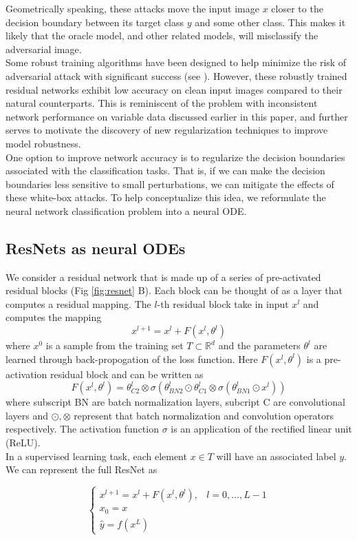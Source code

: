 \documentclass[12pt]{article}
\begin{document}
Geometrically speaking, these attacks move the input image $x$ closer to the decision boundary between its target class $y$ and some other class. This makes it likely that the oracle model, and other related models, will misclassify the adversarial image. \\
Some robust training algorithms have been designed to help minimize the risk of adversarial attack with significant success (see \cite{earmadv}). However, these robustly trained residual networks exhibit low accuracy on clean input images compared to their natural counterparts. This is reminiscent of the problem with inconsistent network performance on variable data discussed earlier in this paper, and further serves to motivate the discovery of new regularization techniques to improve model robustness.\\
 One option to improve network accuracy is to regularize the decision boundaries associated with the classification tasks. That is, if we can make the decision boundaries less sensitive to small perturbations, we can mitigate the effects of these white-box attacks. To help conceptualize this idea, we reformulate the neural network classification problem into a neural ODE.
\subsection{ResNets as neural ODEs}
We consider a residual network that is made up of a series of pre-activated residual blocks (Fig \ref{fig:resnet} B). Each block can be thought of as a layer that computes a residual mapping. The $l$-th residual block take in input $x^l$ and computes the mapping
$$ x^{l+1} = x^{l} + F(x^l,\theta^l)$$
where $x^0$ is a sample from the training set $T \subset \mathbb{R}^d $ and the parameters $\theta^l$ are learned through back-propogation of the loss function. Here $F(x^l,\theta^l)$ is a pre-activation residual block and can be written as
$$ F(x^l,\theta^l) =  \theta^l_{C2}\otimes\sigma(\theta^l_{BN2}\odot\theta^l_{C1}\otimes\sigma(\theta^l_{BN1}\odot x^l))$$
where subscript BN are batch normalization layers, subcript C are convolutional layers and $\odot, \otimes$ represent that batch normalization and convolution operators respectively. The activation function $\sigma$ is an application of the rectified linear unit (ReLU).\\
In a supervised learning task, each element $x \in T$ will have an associated label $y$. We can represent the full ResNet as

\begin{equation} \begin{cases}
x^{l+1} = x^l + F(x^l,\theta^l), & l=0,\dots,L-1 \\
x_0 = x \\
\hat y = f(x^L)
\end{cases}
\label{eq:sys}
\end{equation}
\end{document}

